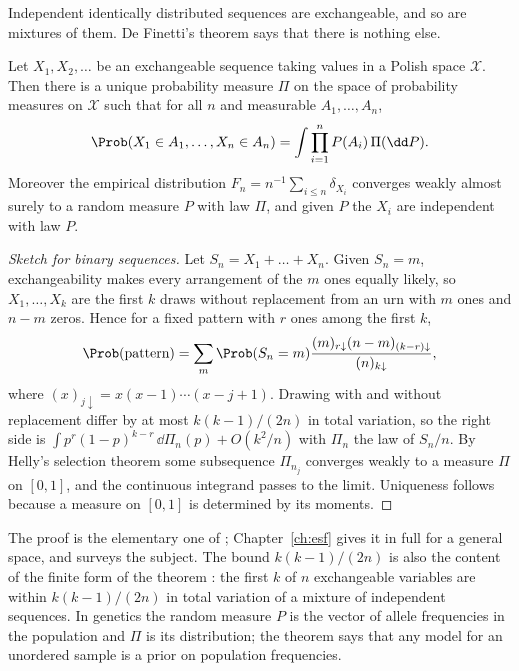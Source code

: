 Independent identically distributed sequences are exchangeable, and so are mixtures of them. De
Finetti's theorem says that there is nothing else.

\begin{theorem}\label{toolkit:thm:definetti}
Let $X_1,X_2,\dots$ be an exchangeable sequence taking values in a Polish space $\mathcal{X}$.
Then there is a unique probability measure $\Pi$ on the space of probability measures on
$\mathcal{X}$ such that for all $n$ and measurable $A_1,\dots,A_n$,
\[
\Prob(X_1\in A_1,\dots,X_n\in A_n)=\int\prod_{i=1}^nP(A_i)\,\Pi(\dd P).
\]
Moreover the empirical distribution $F_n=n^{-1}\sum_{i\le n}\delta_{X_i}$ converges weakly almost
surely to a random measure $P$ with law $\Pi$, and given $P$ the $X_i$ are independent with law
$P$.
\end{theorem}

\begin{proof}[Sketch for binary sequences]
Let $S_n=X_1+\dots+X_n$. Given $S_n=m$, exchangeability makes every arrangement of the $m$ ones
equally likely, so $X_1,\dots,X_k$ are the first $k$ draws without replacement from an urn with
$m$ ones and $n-m$ zeros. Hence for a fixed pattern with $r$ ones among the first $k$,
\[
\Prob(\text{pattern})=\sum_m\Prob(S_n=m)\frac{(m)_{r\downarrow}(n-m)_{(k-r)\downarrow}}{(n)_{k\downarrow}},
\]
where $(x)_{j\downarrow}=x(x-1)\cdots(x-j+1)$. Drawing with and without replacement differ by at
most $k(k-1)/(2n)$ in total variation, so the right side is
$\int p^r(1-p)^{k-r}\,\dd\Pi_n(p)+O(k^2/n)$ with $\Pi_n$ the law of $S_n/n$. By Helly's selection
theorem some subsequence $\Pi_{n_j}$ converges weakly to a measure $\Pi$ on $[0,1]$, and the
continuous integrand passes to the limit. Uniqueness follows because a measure on $[0,1]$ is
determined by its moments.
\end{proof}

The proof is the elementary one of \citet{toolkit:heath1976}; Chapter~\ref{ch:esf} gives it in
full for a general space, and \citet{toolkit:aldous1985} surveys the subject. The bound
$k(k-1)/(2n)$ is also the content of the finite form of the theorem
\citep{toolkit:diaconis1980}: the first $k$ of $n$ exchangeable variables are within $k(k-1)/(2n)$
in total variation of a mixture of independent sequences. In genetics the random measure $P$ is
the vector of allele frequencies in the population and $\Pi$ is its distribution; the theorem
says that any model for an unordered sample is a prior on population frequencies.

